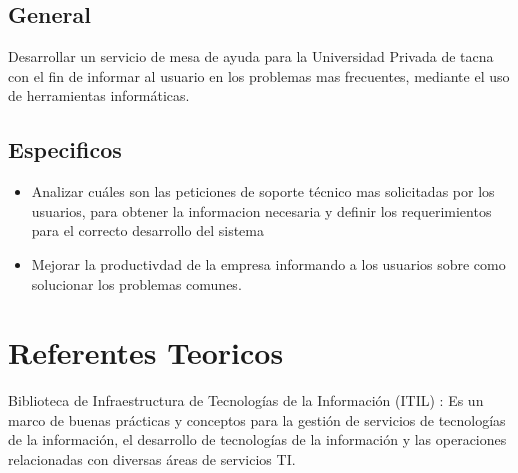\documentclass[preprint,12pt]{elsarticle}
\begin{document}

\subsection{\textbf{General}}

Desarrollar un servicio de mesa de ayuda para la Universidad Privada de tacna con el fin de informar al usuario en los problemas mas frecuentes, mediante el uso de herramientas informáticas.


\subsection{\textbf{Especificos}}

\begin{itemize}

\item Analizar cuáles son las peticiones de soporte técnico mas solicitadas por los usuarios, para obtener la informacion necesaria y definir los requerimientos para el correcto desarrollo del sistema
\item Mejorar la productivdad de la empresa informando a los usuarios sobre como solucionar los problemas comunes.
\end{itemize}


 


\section{Referentes Teoricos}
Biblioteca de Infraestructura de Tecnologías de la Información (ITIL) : Es un marco de buenas prácticas y conceptos para la gestión de servicios de tecnologías de la información, el desarrollo de tecnologías de la información y las operaciones relacionadas con diversas áreas de servicios TI.
\end{document}
